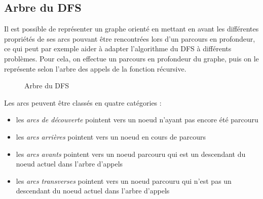 \documentclass[11pt,a4paper]{article}
\begin{document}
  \subsection{Arbre du DFS}
Il est possible de représenter un graphe orienté en mettant en avant les différentes propriétés de ses arcs pouvant être rencontrées lors d'un parcours en profondeur, ce qui peut par exemple aider à adapter l'algorithme du DFS à différents problèmes.
Pour cela, on effectue un parcours en profondeur du graphe, puis on le représente selon l'arbre des appels de la fonction récursive.

\begin{figure}[h]
  \label{arbre-dfs}
  \centering
  \caption{Arbre du DFS}
\end{figure}

Les arcs peuvent être classés en quatre catégories :
\begin{itemize}
  \item[\LARGE\textbf\textrightarrow] les \textit{arcs de découverte} pointent vers un noeud n'ayant pas encore été parcouru
  \item[\color{red} \LARGE\textbf\textrightarrow] les \textit{arcs arrières} pointent vers un noeud en cours de parcours
  \item[\color{green} \LARGE\textbf\textrightarrow] les \textit{arcs avants} pointent vers un noeud parcouru qui est un descendant du noeud actuel dans l'arbre d'appels
  \item[\color{blue} \LARGE\textbf\textrightarrow] les \textit{arcs transverses} pointent vers un noeud parcouru qui n'est pas un descendant du noeud actuel dans l'arbre d'appels
\end{itemize}
\end{document}
